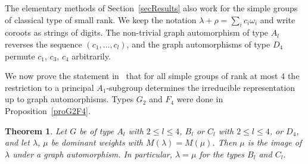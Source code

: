 \documentclass[11pt,a4paper]{article}
\theoremstyle{plain}
\newtheorem{Thm}{Theorem}
\theoremstyle{definition}
\begin{document}
The elementary methods of Section~\ref{secResults} also work for the
simple groups of classical type of small rank. We keep the notation
$\lambda + \rho = \sum_i c_i \omega_i$ and write coroots as strings of
digits. The non-trivial graph automorphism of type $A_l$ reverses the
sequence $(c_1, \ldots, c_l)$, and the graph automorphisms of type $D_4$
permute $c_1$, $c_3$, $c_4$ arbitrarily.

We now prove the statement in~\cite[\S10]{npp} that for all simple groups of
rank at most $4$ the restriction to a principal $A_1$-subgroup determines
the irreducible representation up to graph automorphisms. Types $G_2$ and
$F_4$ were done in Proposition~\ref{proG2F4}.
\begin{Thm}\label{thmClassical}
Let $G$ be of type $A_l$ with $2 \leq l \leq 4$, $B_l$ or $C_l$ with 
$2 \leq l \leq 4$, or $D_4$, and let $\lambda$, $\mu$ be dominant weights
with $M(\lambda) = M(\mu)$. Then $\mu$ is the image of $\lambda$ under a
graph automorphism. In particular, $\lambda = \mu$ for the types $B_l$ and
$C_l$.
\end{Thm}
\end{document}
